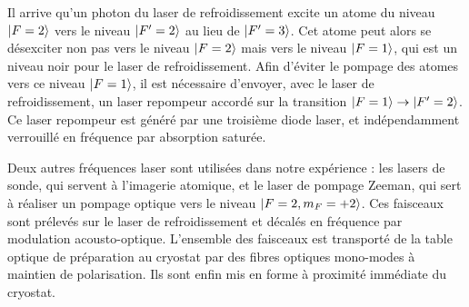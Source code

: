 Il arrive qu'un photon du laser de refroidissement excite un atome du niveau $\ket{F=2}$ vers le niveau $\ket{F'=2}$ au lieu de $\ket{F'=3}$.
Cet atome peut alors se désexciter non pas vers le niveau $\ket{F=2}$ mais vers le niveau $\ket{F=1}$, qui est un niveau noir pour le laser de refroidissement.
Afin d'éviter le pompage des atomes vers ce niveau $\ket{F=1}$, il est nécessaire d'envoyer, avec le laser de refroidissement, un laser \og repompeur\fg{} accordé sur la transition $\ket{F=1}\rightarrow \ket{F'=2}$.
Ce laser repompeur est généré par une troisième diode laser, et indépendamment verrouillé en fréquence par absorption saturée.

Deux autres fréquences laser sont utilisées dans notre expérience : les lasers de sonde, qui servent à l'imagerie atomique, et le laser de pompage Zeeman, qui sert à réaliser un pompage optique vers le niveau $\ket{F=2,m_F=+2}$.
Ces faisceaux sont prélevés sur le laser de refroidissement et décalés en fréquence par modulation acousto-optique.
L'ensemble des faisceaux est transporté de la table optique de préparation au cryostat par des fibres optiques mono-modes à maintien de polarisation.
Ils sont enfin mis en forme à proximité immédiate du cryostat. 




